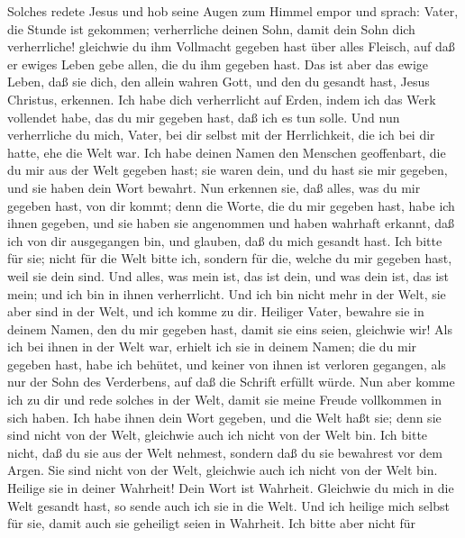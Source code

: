  Solches redete Jesus und hob seine Augen zum Himmel empor
und sprach: Vater, die Stunde ist gekommen; verherrliche deinen Sohn,
damit dein Sohn dich verherrliche!  gleichwie du ihm
Vollmacht gegeben hast über alles Fleisch, auf daß er ewiges Leben gebe
allen, die du ihm gegeben hast.  Das ist aber das ewige
Leben, daß sie dich, den allein wahren Gott, und den du gesandt hast,
Jesus Christus, erkennen.  Ich habe dich verherrlicht auf
Erden, indem ich das Werk vollendet habe, das du mir gegeben hast, daß
ich es tun solle.  Und nun verherrliche du mich, Vater,
bei dir selbst mit der Herrlichkeit, die ich bei dir hatte, ehe die Welt
war.  Ich habe deinen Namen den Menschen geoffenbart, die
du mir aus der Welt gegeben hast; sie waren dein, und du hast sie mir
gegeben, und sie haben dein Wort bewahrt.  Nun erkennen
sie, daß alles, was du mir gegeben hast, von dir kommt; 
denn die Worte, die du mir gegeben hast, habe ich ihnen gegeben, und sie
haben sie angenommen und haben wahrhaft erkannt, daß ich von dir
ausgegangen bin, und glauben, daß du mich gesandt hast. 
Ich bitte für sie; nicht für die Welt bitte ich, sondern für die, welche
du mir gegeben hast, weil sie dein sind.  Und alles, was
mein ist, das ist dein, und was dein ist, das ist mein; und ich bin in
ihnen verherrlicht.  Und ich bin nicht mehr in der Welt,
sie aber sind in der Welt, und ich komme zu dir. Heiliger Vater, bewahre
sie in deinem Namen, den du mir gegeben hast, damit sie eins seien,
gleichwie wir!  Als ich bei ihnen in der Welt war,
erhielt ich sie in deinem Namen; die du mir gegeben hast, habe ich
behütet, und keiner von ihnen ist verloren gegangen, als nur der Sohn
des Verderbens, auf daß die Schrift erfüllt würde.  Nun
aber komme ich zu dir und rede solches in der Welt, damit sie meine
Freude vollkommen in sich haben.  Ich habe ihnen dein
Wort gegeben, und die Welt haßt sie; denn sie sind nicht von der Welt,
gleichwie auch ich nicht von der Welt bin.  Ich bitte
nicht, daß du sie aus der Welt nehmest, sondern daß du sie bewahrest vor
dem Argen.  Sie sind nicht von der Welt, gleichwie auch
ich nicht von der Welt bin.  Heilige sie in deiner
Wahrheit! Dein Wort ist Wahrheit.  Gleichwie du mich in
die Welt gesandt hast, so sende auch ich sie in die Welt.
 Und ich heilige mich selbst für sie, damit auch sie
geheiligt seien in Wahrheit.  Ich bitte aber nicht für

